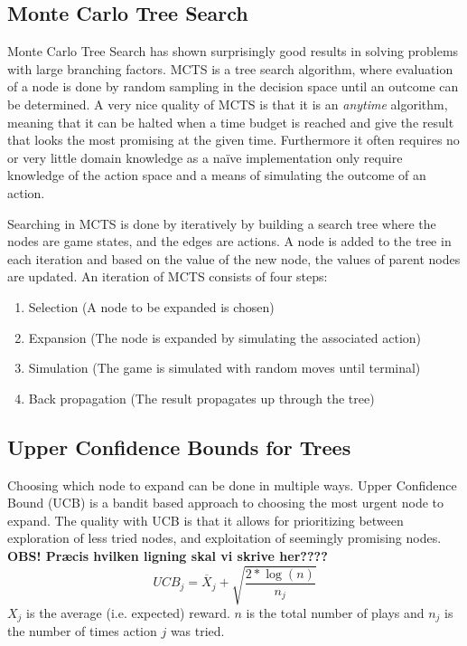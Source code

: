 \documentclass[10pt,a4paper]{article}
\begin{document}
\subsection{Monte Carlo Tree Search}
Monte Carlo Tree Search has shown surprisingly good results in solving problems with large branching factors. MCTS is a tree search algorithm, where evaluation of a node is done by random sampling in the decision space until an outcome can be determined. A very nice quality of MCTS is that it is an \emph{anytime} algorithm, meaning that it can be halted when a time budget is reached and give the result that looks the most promising at the given time. Furthermore it often requires no or very little domain knowledge as a naïve implementation only require knowledge of the action space and a means of simulating the outcome of an action. %

Searching in MCTS is done by iteratively by building a search tree where the nodes are game states, and the edges are actions. A node is added to the tree in each iteration and based on the value of the new node, the values of parent nodes are updated.
An iteration of MCTS consists of four steps:
\begin{enumerate}
\item Selection (A node to be expanded is chosen)
\item Expansion (The node is expanded by simulating the associated action)
\item Simulation (The game is simulated with random moves until terminal)
\item Back propagation (The result propagates up through the tree)
\end{enumerate}

\subsection{Upper Confidence Bounds for Trees}
Choosing which node to expand can be done in multiple ways. Upper Confidence Bound (UCB) is a bandit based approach to choosing the most urgent node to expand. The quality with UCB is that it allows for prioritizing between exploration of less tried nodes, and exploitation of seemingly promising nodes.
\textbf{OBS! Præcis hvilken ligning skal vi skrive her????}
\begin{equation}
\label{eq:ucb1}
\displaystyle UCB_j = \overline{X}_j + \sqrt{\frac{2 * \log(n)}{n_j}}
\end{equation}
$X_j$ is the average (i.e. expected) reward. $n$ is the total number of plays and $n_j$ is the number of times action $j$ was tried.
\end{document}
